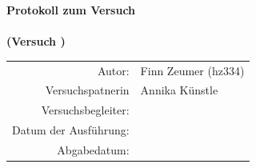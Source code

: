 \begin{titlepage}
\vspace*{2cm} 
  
  \centering
    
  {\LARGE\bfseries Protokoll zum Versuch \\[0.2cm]
  \textit{\versuchsname{\versuchsnummer}} \\[0.5cm] %
  {\large (Versuch {\versuchsnummer})}
  \vspace{1cm}}

  {\large
  \begin{tabular}{@{}rl@{}}
    Autor:                  & Finn Zeumer (hz334)\\
    Versuchspatnerin        & Annika Künstle\\[0.5em]
    Versuchsbegleiter:      & {\begleiter{\versuchsnummer}}\\[0.5em]
    Datum der Ausführung:   & {\durchfuehrungsdatum{\versuchsnummer}}\\
    \small{Abgabedatum:}    & \small{\abgabedatum{\versuchsnummer}}\\
  \end{tabular}
  }
  \vfill


  
\end{titlepage}